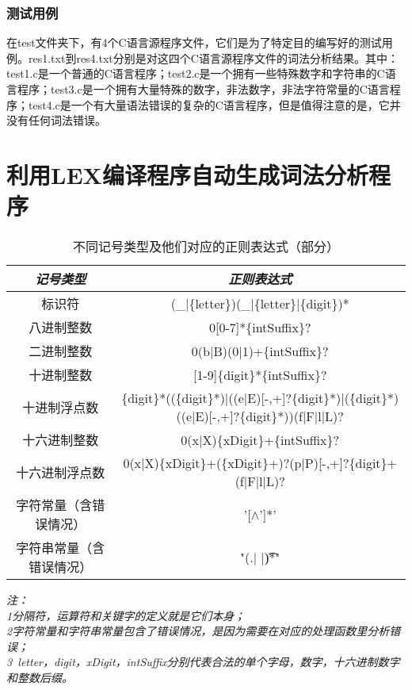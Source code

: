 \documentclass[twocolumn]{article}
\begin{document}
\subsubsection{测试用例}
在test文件夹下，有4个C语言源程序文件，它们是为了特定目的编写好的测试用例。res1.txt到res4.txt分别是对这四个C语言源程序文件的词法分析结果。其中：test1.c是一个普通的C语言程序；test2.c是一个拥有一些特殊数字和字符串的C语言程序；test3.c是一个拥有大量特殊的数字，非法数字，非法字符常量的C语言程序；test4.c是一个有大量语法错误的复杂的C语言程序，但是值得注意的是，它并没有任何词法错误。

\section{利用LEX编译程序自动生成词法分析程序}
\begin{table*}[t]
\centering
\caption{不同记号类型及他们对应的正则表达式（部分）}
\begin{threeparttable}
\begin{tabular}{|c|c|} \hline
{\textit{记号类型}}&{\textit{正则表达式}} \\ \hline
{标识符} & (\_|\{letter\})(\_|\{letter\}|\{digit\})* \\ \hline
{八进制整数} & 0[0-7]*\{intSuffix\}?\\ \hline
{二进制整数} & 0(b|B)(0|1)+\{intSuffix\}?\\ \hline
{十进制整数} & [1-9]\{digit\}*\{intSuffix\}?\\ \hline
{十进制浮点数} & \{digit\}*((\.\{digit\}*)|((e|E)[-,+]?\{digit\}*)|(\.\{digit\}*)((e|E)[-,+]?\{digit\}*))(f|F|l|L)?\\ \hline
{十六进制整数} & 0(x|X)\{xDigit\}+\{intSuffix\}?\\ \hline
{十六进制浮点数} & 0(x|X)\{xDigit\}+(\.\{xDigit\}+)?(p|P)[-,+]?\{digit\}+(f|F|l|L)?\\ \hline
{字符常量（含错误情况）} & '[$\wedge$']*' \\ \hline
{字符串常量（含错误情况）} & "(.| |\t)*" \\ \hline
\end{tabular}
\textit{注：\\1分隔符，运算符和关键字的定义就是它们本身；\\2字符常量和字符串常量包含了错误情况，是因为需要在对应的处理函数里分析错误；\\3\ letter，digit，xDigit，intSuffix分别代表合法的单个字母，数字，十六进制数字和整数后缀。}
\end{threeparttable}
\end{table*}
\end{document}
